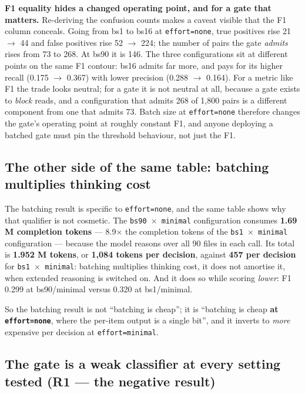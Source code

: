 \documentclass[10pt]{article}
\begin{document}
\textbf{F1 equality hides a changed operating point, and for a gate that matters.} Re-deriving the confusion counts makes a caveat visible that the F1 column conceals. Going from bs1 to bs16 at \texttt{effort=none}, true positives rise 21 $\to$ 44 and false positives rise 52 $\to$ 224; the number of pairs the gate \emph{admits} rises from 73 to 268. At bs90 it is 146. The three configurations sit at different points on the same F1 contour: bs16 admits far more, and pays for its higher recall (0.175 $\to$ 0.367) with lower precision (0.288 $\to$ 0.164). For a metric like F1 the trade looks neutral; for a gate it is not neutral at all, because a gate exists to \emph{block} reads, and a configuration that admits 268 of 1,800 pairs is a different component from one that admits 73. Batch size at \texttt{effort=none} therefore changes the gate's operating point at roughly constant F1, and anyone deploying a batched gate must pin the threshold behaviour, not just the F1.

\subsection{The other side of the same table: batching multiplies thinking cost}

The batching result is specific to \texttt{effort=none}, and the same table shows why that qualifier is not cosmetic. The \texttt{bs90 $\times$ minimal} configuration consumes \textbf{1.69 M completion tokens} --- 8.9$\times$ the completion tokens of the \texttt{bs1 $\times$ minimal} configuration --- because the model reasons over all 90 files in each call. Its total is \textbf{1.952 M tokens}, or \textbf{1,084 tokens per decision}, against \textbf{457 per decision} for \texttt{bs1 $\times$ minimal}: batching multiplies thinking cost, it does not amortise it, when extended reasoning is switched on. And it does so while scoring \emph{lower}: F1 0.299 at bs90/minimal versus 0.320 at bs1/minimal.

So the batching result is not ``batching is cheap''; it is ``batching is cheap \textbf{at \texttt{effort=none}}, where the per-item output is a single bit'', and it inverts to \emph{more} expensive per decision at \texttt{effort=minimal}.

\subsection{The gate is a weak classifier at every setting tested (R1 --- the negative result)}
\end{document}
